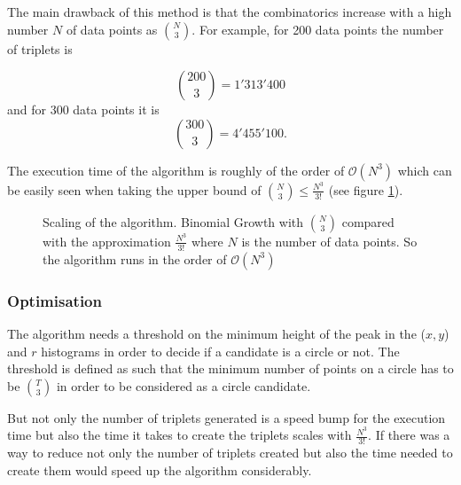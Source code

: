 \documentclass[11pt,twoside]{scrreprt}
\begin{document}
The main drawback of this method is that the combinatorics increase with a high number $N$ of data points as \( \binom{N}{3} \). For example, for 200 data points the number of triplets is

\[ \binom{200}{3} = 1'313'400 \]
and for 300 data points it is
\[ \binom{300}{3} = 4'455'100. \]

The execution time of the algorithm is roughly of the order of $\mathcal{O}(N^3)$ which can be easily seen when taking the upper bound of $\binom{N}{3} \leq \frac{N^3}{3!}$ (see figure \ref{fig:binom_growth}). 
\begin{figure}[ht]
\centering
    \caption[Complexity of the combinatorial triplet Hough transform]{Scaling of the algorithm. Binomial Growth with $\binom{N}{3}$ compared with the approximation $\frac{N^3}{3!}$ where $N$ is the number of data points. So the algorithm runs in the order of $\mathcal{O}(N^3)$}
  \label{fig:binom_growth}
\end{figure}


\subsubsection{Optimisation} %
\label{ssub:improvement_of_speed}

The algorithm needs a threshold on the minimum height of the peak in the ($x,y$) and $r$ histograms in order to decide if a candidate is a circle or not. The threshold is defined as such that the minimum number of points on a circle has to be $\binom{T}{3}$ in order to be considered as a circle candidate. 

But not only the number of triplets generated is a speed bump for the execution time but also the time it takes to create the triplets scales with $\frac{N^3}{3!}$. If there was a way to reduce not only the number of triplets created but also the time needed to create them would speed up the algorithm considerably.
\end{document}

